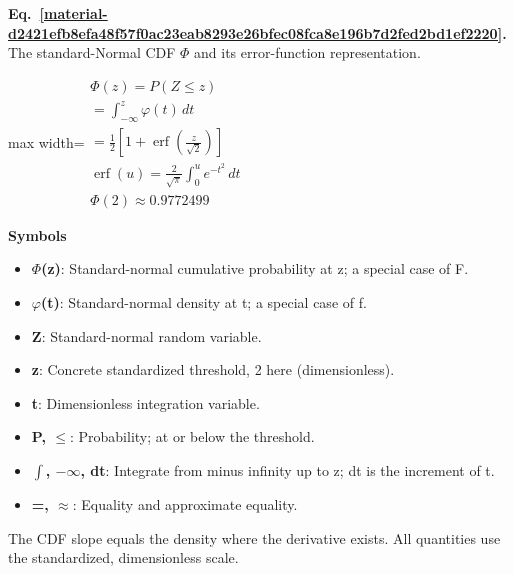 \documentclass[11pt,a4paper]{article}
\begin{document}
\par\medskip
\noindent\begin{minipage}{\linewidth}
\label{material-d2421efb8efa48f57f0ac23eab8293e26bfec08fca8e196b7d2fed2bd1ef2220}
\noindent\textbf{Eq.~\ref*{material-d2421efb8efa48f57f0ac23eab8293e26bfec08fca8e196b7d2fed2bd1ef2220}.} The standard-Normal CDF \(\Phi\) and its error-function representation.\par\nopagebreak
\begin{center}\begin{adjustbox}{max width=\linewidth}$\displaystyle \begin{gathered}\Phi(z)=P(Z\le z)\\=\int_{-\infty}^{z}\varphi(t)\,dt\\=\frac12\left[1+\operatorname{erf}\!\left(\frac{z}{\sqrt2}\right)\right]\\\operatorname{erf}(u)=\frac{2}{\sqrt\pi}\int_0^u e^{-t^2}\,dt\\\Phi(2)\approx0.9772499\end{gathered}$\end{adjustbox}\end{center}

\par\noindent\textbf{Symbols}

\begin{itemize}\setlength{\itemsep}{1pt}\setlength{\parsep}{0pt}
\item \textbf{\ensuremath{\Phi}(z)}: Standard-normal cumulative probability at z; a special case of F.
\item \textbf{\ensuremath{\varphi}(t)}: Standard-normal density at t; a special case of f.
\item \textbf{Z}: Standard-normal random variable.
\item \textbf{z}: Concrete standardized threshold, 2 here (dimensionless).
\item \textbf{t}: Dimensionless integration variable.
\item \textbf{P, \ensuremath{\le}}: Probability; at or below the threshold.
\item \textbf{\ensuremath{\int}, \ensuremath{-}\ensuremath{\infty}, dt}: Integrate from minus infinity up to z; dt is the increment of t.
\item \textbf{=, \ensuremath{\approx}}: Equality and approximate equality.
\end{itemize}

The CDF slope equals the density where the derivative exists. All quantities use the standardized, dimensionless scale.


\end{minipage}
\end{document}
